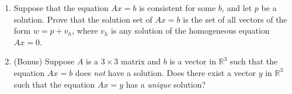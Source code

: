 \documentclass[12pt]{article}
\begin{document}
\begin{multicols*}{2}
\begin{enumerate}
		\item Suppose that the equation $Ax=b$ is consistent for some $b$, and let $p$ be a solution. Prove that the solution set of $Ax=b$ is the set of all vectors of the form $w=p+v_h$, where $v_h$ is any solution of the homogeneous equation $Ax=0$.
		\vfill

		\item (Bonus) Suppose $A$ is a $3\times 3$ matrix and $b$ is a vector in $\mathbb{R}^3$ such that the equation $Ax=b$ does \textit{not} have a solution. Does there exist a vector $y$ in $\mathbb{R}^3$ such that the equation $Ax=y$ has a \textit{unique} solution?
		\vfill
	\end{enumerate}
\end{multicols*}
\end{document}
